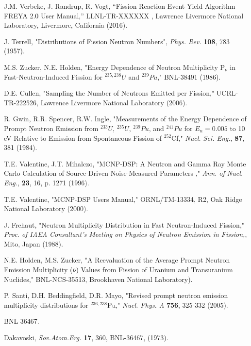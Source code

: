 
 J.M. Verbeke, J. Randrup, R. Vogt, ``Fission Reaction Event Yield Algorithm FREYA 2.0 User Manual,'' LLNL-TR-XXXXXX , Lawrence Livermore National Laboratory, Livermore, California (2016).

 J. Terrell, "Distributions of Fission Neutron
Numbers", \textit{Phys. Rev.} \textbf{108}, 783 (1957).

 M.S. Zucker, N.E. Holden, "Energy
Dependence of Neutron Multiplicity P$_{\nu}$ in Fast-Neutron-Induced
Fission for $^{235,238}U$ and $^{239}Pu$," BNL-38491 (1986).

 D.E. Cullen, "Sampling the Number of Neutrons
Emitted per Fission," UCRL-TR-222526, Lawrence Livermore National
Laboratory (2006).  

 R. Gwin, R.R. Spencer,
R.W. Ingle, "Measurements of the Energy Dependence of Prompt Neutron
Emission from $^{233}U$, $^{235}U$, $^{239}Pu$, and $^{241}Pu$ for
$E_n=0.005$ to 10 eV Relative to Emission from Spontaneous Fission of
$^{252}$Cf," \textit{Nucl. Sci. Eng.}, \textbf{87}, 381 (1984).

 T.E. Valentine, J.T. Mihalczo, "MCNP-DSP: A
Neutron and Gamma Ray Monte Carlo Calculation of Source-Driven
Noise-Measured Parameters ," \textit{Ann. of Nucl. Eng.}, \textbf{23},
16, p. 1271 (1996).

 T.E. Valentine, "MCNP-DSP Users Manual,"
ORNL/TM-13334, R2, Oak Ridge National Laboratory (2000).

 J. Frehaut, "Neutron Multiplicity Distribution
in Fast Neutron-Induced Fission," \textit{Proc. of IAEA Consultant's
Meeting on Physics of Neutron Emission in Fission,}, Mito, Japan
(1988).  

 N.E. Holden,
M.S. Zucker, "A Reevaluation of the Average Prompt Neutron Emission
Multiplicity ($\bar{\nu}$) Values from Fission of Uranium and
Transuranium Nuclides," BNL-NCS-35513, Brookhaven National
Laboratory).  

 P. Santi, D.H. Beddingfield, D.R. Mayo, "Revised
prompt neutron emission multiplicity distributions for $^{236,238}$Pu,"
 \textit{Nucl. Phys. A} \textbf{756}, 325-332 (2005).

 BNL-36467.

 Dakavoski, \textit{Sov.Atom.Erg.} \textbf{17},
360, BNL-36467, (1973).

